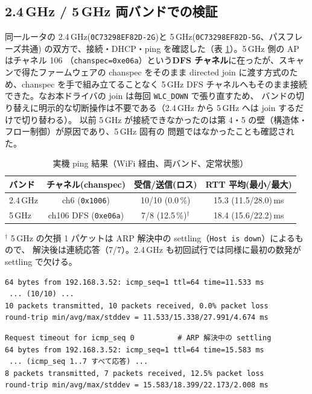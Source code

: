 \documentclass[a4paper,11pt]{ltjsarticle}
\begin{document}
\subsection{2.4\,GHz / 5\,GHz 両バンドでの検証}
同一ルータの 2.4\,GHz(\texttt{0C73298EF82D-2G})と 5\,GHz(\texttt{0C73298EF82D-5G}、パスフレーズ共通)
の双方で、接続・DHCP・ping を確認した（表 \ref{tab:ping}）。5\,GHz 側の AP はチャネル 106
（\texttt{chanspec=0xe06a}）という\textbf{DFS チャネル}に在ったが、スキャンで得たファームウェアの
chanspec をそのまま directed join に渡す方式のため、chanspec を手で組み立てることなく 5\,GHz DFS
チャネルへもそのまま接続できた。なお本ドライバの join は毎回 \texttt{WLC\_DOWN} で張り直すため、
バンドの切り替えに明示的な切断操作は不要である（2.4\,GHz から 5\,GHz へは join するだけで切り替わる）。
以前 5\,GHz が接続できなかったのは第 4・5 の壁（構造体・フロー制御）が原因であり、5\,GHz 固有の
問題ではなかったことも確認された。

\begin{table}[h]
\centering
\caption{実機 ping 結果（WiFi 経由、両バンド、定常状態）}
\label{tab:ping}
\small
\begin{tabular}{@{}lccc@{}}
\toprule
バンド & チャネル(chanspec) & 受信/送信(ロス) & RTT 平均(最小/最大) \\
\midrule
2.4\,GHz & ch6 (\texttt{0x1006})  & 10/10 (0.0\,\%)  & 15.3 (11.5/28.0)\,ms \\
5\,GHz   & ch106 DFS (\texttt{0xe06a}) & 7/8 (12.5\,\%)$^{\dagger}$ & 18.4 (15.6/22.2)\,ms \\
\bottomrule
\end{tabular}

\vspace{2pt}
{\footnotesize $^{\dagger}$ 5\,GHz の欠損 1 パケットは ARP 解決中の settling（\texttt{Host is down}）によるもので、
解決後は連続応答（7/7）。2.4\,GHz も初回試行では同様に最初の数発が settling で欠ける。}
\end{table}

\begin{lstlisting}[numbers=none,caption={実機 ping 出力（2.4\,GHz、定常 10 パケット）}]
64 bytes from 192.168.3.52: icmp_seq=1 ttl=64 time=11.533 ms
 ... (10/10) ...
10 packets transmitted, 10 packets received, 0.0% packet loss
round-trip min/avg/max/stddev = 11.533/15.338/27.991/4.674 ms
\end{lstlisting}

\begin{lstlisting}[numbers=none,caption={実機 ping 出力（5\,GHz DFS ch106、抜粋）}]
Request timeout for icmp_seq 0          # ARP 解決中の settling
64 bytes from 192.168.3.52: icmp_seq=1 ttl=64 time=15.583 ms
 ... (icmp_seq 1..7 すべて応答) ...
8 packets transmitted, 7 packets received, 12.5% packet loss
round-trip min/avg/max/stddev = 15.583/18.399/22.173/2.008 ms
\end{lstlisting}
\end{document}
